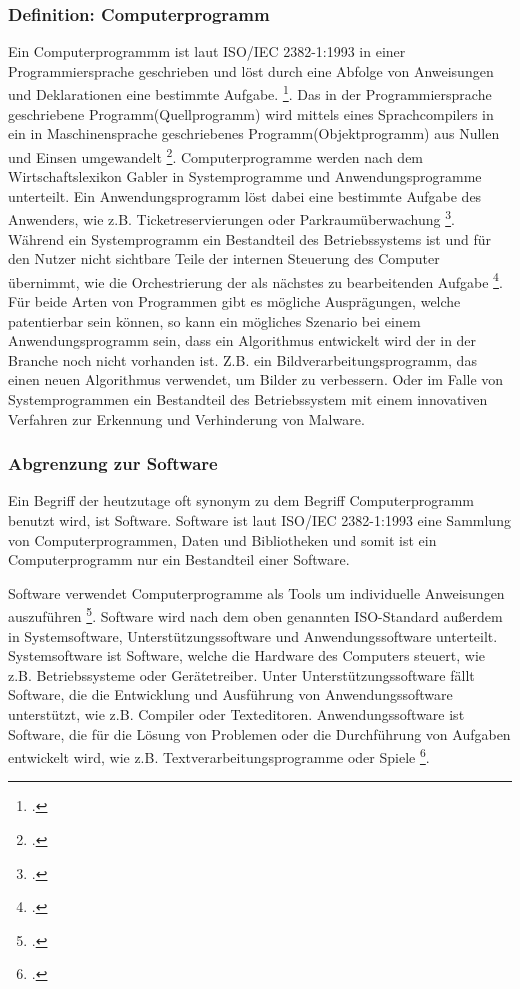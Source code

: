 \subsubsection{Definition: Computerprogramm}
Ein Computerprogrammm ist laut ISO/IEC 2382-1:1993 
in einer Programmiersprache geschrieben und löst durch
eine Abfolge von Anweisungen und Deklarationen eine bestimmte Aufgabe.
\footcite{instituteofelectricalandelectronicsengineersinc.ISO47652010}.
Das in der Programmiersprache geschriebene Programm(Quellprogramm) wird 
mittels eines Sprachcompilers in ein in Maschinensprache geschriebenes 
Programm(Objektprogramm) aus Nullen und Einsen umgewandelt \footcite{WasIstProgramm}.
Computerprogramme werden nach dem Wirtschaftslexikon Gabler in Systemprogramme
und Anwendungsprogramme unterteilt. 
Ein Anwendungsprogramm löst dabei eine bestimmte Aufgabe des Anwenders, 
wie z.B. Ticketreservierungen oder Parkraumüberwachung 
\footcite{lackesDefinitionAnwendungsprogramm}. 
Während ein Systemprogramm ein Bestandteil des Betriebssystems ist und 
für den Nutzer nicht sichtbare Teile der internen Steuerung des Computer übernimmt,
wie die Orchestrierung der als nächstes 
zu bearbeitenden Aufgabe \footcite{lackesDefinitionSystemprogramm}.
Für beide Arten von Programmen gibt es mögliche Ausprägungen, 
welche patentierbar sein können, 
so kann ein mögliches Szenario bei einem Anwendungsprogramm sein,
dass ein Algorithmus entwickelt wird der in der Branche noch nicht vorhanden ist. 
Z.B. ein
Bildverarbeitungsprogramm, das einen neuen Algorithmus verwendet, 
um Bilder zu verbessern.
Oder im Falle von Systemprogrammen ein Bestandteil des Betriebssystem mit einem 
innovativen Verfahren zur Erkennung und Verhinderung von Malware.

\subsubsection{Abgrenzung zur Software}
Ein Begriff der heutzutage oft synonym zu dem Begriff Computerprogramm benutzt wird,
ist Software. Software ist 
laut ISO/IEC 2382-1:1993 eine Sammlung von Computerprogrammen, 
Daten und Bibliotheken und 
somit ist ein Computerprogramm nur ein Bestandteil einer Software.

Software verwendet Computerprogramme 
als Tools um individuelle Anweisungen auszuführen 
\footcite{ComputerProgrammeUnverzichtbareComputerprogramme}.
Software wird nach dem oben genannten ISO-Standard außerdem in 
Systemsoftware, Unterstützungssoftware und Anwendungssoftware unterteilt.
Systemsoftware ist Software, welche die Hardware des Computers steuert, 
wie z.B. Betriebssysteme oder Gerätetreiber. Unter Unterstützungssoftware 
fällt Software, die die Entwicklung und Ausführung von Anwendungssoftware
unterstützt, wie z.B. Compiler oder Texteditoren. Anwendungssoftware ist
Software, die für die Lösung von Problemen oder die Durchführung von Aufgaben
entwickelt wird, wie z.B. Textverarbeitungsprogramme oder Spiele
\footcite{instituteofelectricalandelectronicsengineersinc.ISO47652010}.
\\

